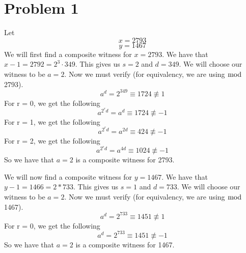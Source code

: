 \documentclass{article}
\begin{document}
\section*{Problem 1}
Let
\[ x = 2793 \]
\[ y = 1467 \]
We will first find a composite witness for $x = 2793$. We have that $x - 1 = 2792 =
2^3 \cdot 349$. This gives us $s = 2$ and $d = 349$. We will choose our witness to be
$a = 2$. Now we must verify (for equivalency, we are using $\bmod$ 2793).
\[ a^d = 2^{349} \equiv 1724 \not\equiv 1 \]
For r = 0, we get the following
\[ a^{2^rd} = a^d \equiv 1724 \not\equiv -1 \]
For r = 1, we get the following
\[ a^{2^rd} = a^{2d} \equiv 424 \not\equiv -1 \]
For r = 2, we get the following
\[ a^{2^rd} = a^{4d} \equiv 1024 \not\equiv -1 \]
So we have that $a = 2$ is a composite witness for 2793.


\vspace{5mm}
We will now find a composite witness for $y = 1467$. We have that $y - 1 = 1466 =
2 * 733$. This gives us $s = 1$ and $d = 733$. We will choose our witness to be
$a = 2$. Now we must verify (for equivalency, we are using $\bmod$ 1467).
\[ a^d = 2^{733} \equiv 1451 \not\equiv 1 \]
For r = 0, we get the following
\[ a^d = 2^{733} \equiv 1451 \not\equiv -1 \]
So we have that $a = 2$ is a composite witness for 1467.

\end{document}
